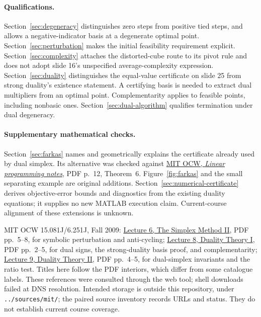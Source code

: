 \documentclass[11pt,a4paper]{article}
\begin{document}
\paragraph{Qualifications.}
Section~\ref{sec:degeneracy} distinguishes zero steps from positive tied steps,
and allows a negative-indicator basis at a degenerate optimal point.
Section~\ref{sec:perturbation} makes the initial feasibility requirement explicit.
Section~\ref{sec:complexity} attaches the distorted-cube route to its pivot rule
and does not adopt slide 16's unspecified average-complexity expression.
Section~\ref{sec:duality} distinguishes the equal-value certificate on slide 25
from strong duality's existence statement. A certifying basis is needed to
extract dual multipliers from an optimal point. Complementarity applies to
feasible points, including nonbasic ones. Section~\ref{sec:dual-algorithm}
qualifies termination under dual degeneracy.

\paragraph{Supplementary mathematical checks.}
Section~\ref{sec:farkas} names and geometrically explains the certificate
already used by dual simplex. Its alternative was checked against
\href{https://ocw.mit.edu/courses/6-854j-advanced-algorithms-fall-2008/908fe54d659623efadda2d033b895caf_notes_lp.pdf}{MIT OCW,
  \emph{Linear programming notes}}, PDF p.~12, Theorem~6.
Figure~\ref{fig:farkas} and the small separating example are original additions.
Section~\ref{sec:numerical-certificate} derives objective-error bounds and
diagnostics from the existing duality equations; it supplies no new MATLAB
execution claim. Current-course alignment of these extensions is unknown.

MIT OCW 15.081J/6.251J, Fall 2009:
\href{https://ocw.mit.edu/courses/6-251j-introduction-to-mathematical-programming-fall-2009/2ef2f1dd7045b5f29e5faea299fb0798_MIT6_251JF09_lec06.pdf}{Lecture 6, The Simplex Method II},
PDF pp.~5--8, for symbolic perturbation and anti-cycling;
\href{https://ocw.mit.edu/courses/6-251j-introduction-to-mathematical-programming-fall-2009/496d9a385fd1d7e1aa82837d91adb23e_MIT6_251JF09_lec08.pdf}{Lecture 8, Duality Theory I},
PDF pp.~2--5, for dual signs, the strong-duality basis proof, and complementarity;
\href{https://ocw.mit.edu/courses/6-251j-introduction-to-mathematical-programming-fall-2009/b93d1665d7a8f05ea626b8f04c7ad66c_MIT6_251JF09_lec09.pdf}{Lecture 9, Duality Theory II},
PDF pp.~4--5, for dual-simplex invariants and the ratio test.
Titles here follow the PDF interiors, which differ from some catalogue labels.
These references were consulted through the web tool; shell downloads failed
at DNS resolution. Intended storage is outside this repository, under
\texttt{../sources/mit/}; the paired source inventory records URLs and status.
They do not establish current course coverage.
\end{document}
